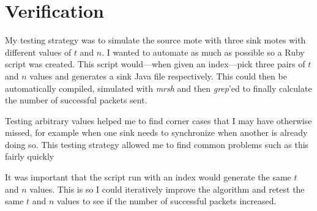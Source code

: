 \documentclass{article}
\begin{document}
\section{Verification}

My testing strategy was to simulate the source mote with three sink motes with different values of $t$ and $n$. I wanted to automate as much as possible so a Ruby script was created. This script would---when given an index---pick three pairs of $t$ and $n$ values and generates a sink Java file respectively. This could then be automatically compiled, simulated with \emph{mrsh} and then \emph{grep}'ed to finally calculate the number of successful packets sent.

Testing arbitrary values helped me to find corner cases that I may have otherwise missed, for example when one sink needs to synchronize when another is already doing so. This testing strategy allowed me to find common problems such as this fairly quickly

It was important that the script run with an index would generate the same $t$ and $n$ values. This is so I could iteratively improve the algorithm and retest the same $t$ and $n$ values to see if the number of successful packets increased.






%
\end{document}
